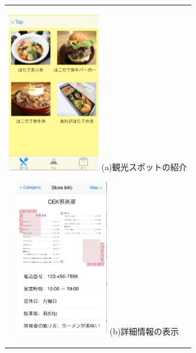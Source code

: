 \begin{figure}[htbp]
  \begin{center}
    \begin{tabular}{c}

      \begin{minipage}{0.33\hsize}
        \begin{center}
\includegraphics[width=4cm, bb=0 0 320 552]{5.4_category.png}
          \hspace{1cm} (a)観光スポットの紹介
        \end{center}
      \end{minipage}

      \begin{minipage}{0.33\hsize}
        \begin{center}
\includegraphics[width=4cm, bb=0 0 321 547]{5.4_detail.png}
          \hspace{1cm} (b)詳細情報の表示
        \end{center}
      \end{minipage}


\end{tabular}
\end{center}
\end{figure}
